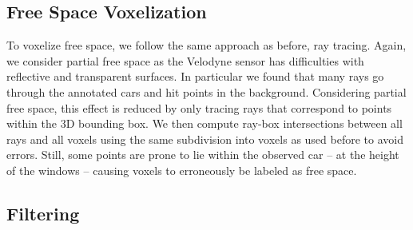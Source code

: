 \subsection{Free Space Voxelization}

To voxelize free space, we follow the same approach as before, \ie ray tracing.
Again, we consider partial free space as the Velodyne sensor has difficulties with
reflective and transparent surfaces. In particular we found that many
rays go through the annotated cars and hit points in the background. 
Considering partial free space, this effect is reduced by only tracing
rays that correspond to points within the 3D bounding box.
We then compute ray-box intersections between all rays and all voxels
using the same subdivision into voxels as used before to avoid errors.
Still, some points are prone to lie within the observed car -- \eg at the
height of the windows -- causing voxels to erroneously be labeled as
free space.

\subsection{Filtering}

